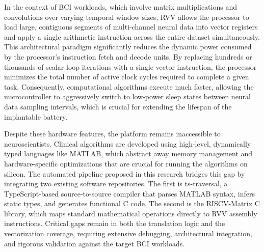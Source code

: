 In the context of BCI workloads, which involve matrix multiplications and convolutions over varying temporal window sizes, RVV allows the processor to load large, contiguous segments of multi-channel neural data into vector registers and apply a single arithmetic instruction across the entire dataset simultaneously. This architectural paradigm significantly reduces the dynamic power consumed by the processor’s instruction fetch and decode units. By replacing hundreds or thousands of scalar loop iterations with a single vector instruction, the processor minimizes the total number of active clock cycles required to complete a given task. Consequently, computational algorithms execute much faster, allowing the microcontroller to aggressively switch to low-power sleep states between neural data sampling intervals, which is crucial for extending the lifespan of the implantable battery. 

Despite these hardware features, the platform remains inaccessible to neuroscientists. Clinical algorithms are developed using high-level, dynamically typed languages like MATLAB, which abstract away memory management and hardware-specific optimizations that are crucial for running the algorithms on silicon. The automated pipeline proposed in this research bridges this gap by integrating two existing software repositories. The first is ts-traversal, a TypeScript-based source-to-source compiler that parses MATLAB syntax, infers static types, and generates functional C code. The second is the RISCV-Matrix C library, which maps standard mathematical operations directly to RVV assembly instructions. Critical gaps remain in both the translation logic and the vectorization coverage, requiring extensive debugging, architectural integration, and rigorous validation against the target BCI workloads.

